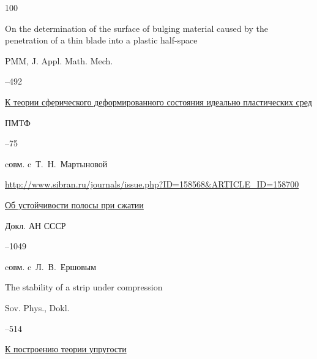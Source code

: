\begin{thebibliography}{100}
\transl


\paper On the determination of the surface of bulging material caused by the penetration of a thin blade into a plastic half-space

\jour PMM, J. Appl. Math. Mech. 


--492 






\paper \href{https://zbmath.org/?q=an:0122.42802}{К теории сферического деформированного состояния идеально пластических сред}

\jour ПМТФ



–75 

\miscnote cовм. c~Т.~Н.~Мартыновой


\elink \url{http://www.sibran.ru/journals/issue.php?ID=158568&ARTICLE_ID=158700}




\paper  \href{https://zbmath.org/?q=an:0113.17701}{Об устойчивости полосы при сжатии}

\jour Докл. АН СССР




–1049 

\miscnote cовм. c~Л.~В.~Ершовым


\transl


\paper The stability of a strip under compression

\jour Sov. Phys., Dokl. 


--514 





\paper  \href{https://zbmath.org/?q=an:0117.18401}{К построению теории упругости}


\end{thebibliography}

